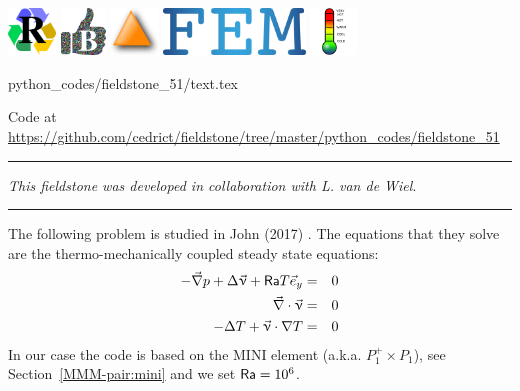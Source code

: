 \includegraphics[height=1.25cm]{images/pictograms/replication}
\includegraphics[height=1.25cm]{images/pictograms/benchmark}
\includegraphics[height=1.25cm]{images/pictograms/triangle}
\includegraphics[height=1.25cm]{images/pictograms/FEM}
\includegraphics[height=1.25cm]{images/pictograms/temperature}


\begin{flushright} {\tiny {\color{gray} python\_codes/fieldstone\_51/text.tex}} \end{flushright}



\begin{center}
\inpython
Code at \url{https://github.com/cedrict/fieldstone/tree/master/python_codes/fieldstone_51}
\end{center}

\par\noindent\rule{\textwidth}{0.4pt}

{\sl This fieldstone was developed in collaboration with L. van de Wiel}. 

\par\noindent\rule{\textwidth}{0.4pt}


The following problem is studied in John \etal (2017) \cite{jolm17}. 
The equations that they solve are the thermo-mechanically coupled steady state equations:
\begin{eqnarray}
-\vec{\nabla}p + \Delta \vec{\upnu} + {\mathsf{Ra}} T \vec{e}_y &=& 0\\
\vec\nabla\cdot\vec\upnu &=& 0 \\
-\Delta T + \vec\upnu\cdot\nabla T &=& 0
\end{eqnarray}
In our case the code is based on the MINI element (a.k.a. $P_1^+ \times P_1$), 
see Section~\ref{MMM-pair:mini}
and we set ${\mathsf{Ra}}=10^6$.

